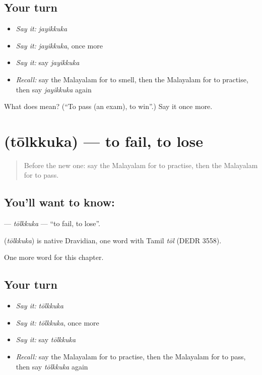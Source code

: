 \subsection*{Your turn}
\begin{itemize}
\raggedright
  \item \emph{Say it:} \emph{jayikkuka}
  \item \emph{Say it:} \emph{jayikkuka}, once more
  \item \emph{Say it:} say \emph{jayikkuka}
  \item \emph{Recall:} say the Malayalam for to smell, then the Malayalam for to practise, then say \emph{jayikkuka} again
\end{itemize}

\begin{tcolorbox}[breakable,colback=teal!4,colframe=teal!35!black,title={Before you move on}]
What does  mean? (\textquotedblleft{}To pass (an exam), to win\textquotedblright{}.) Say it once more.
\end{tcolorbox}
\section[\texorpdfstring{\ml{തോൽക്കുക} (tōlkkuka)}{തോൽക്കുക (tōlkkuka)}]{ (tōlkkuka) — to fail, to lose}

\label{lesson:ML-C267-tolkkuka}



\begin{quote}
Before the new one: say the Malayalam for to practise, then the Malayalam for to pass.
\end{quote}

\subsection*{You'll want to know: }
\textbf{} — \emph{tōlkkuka} — \textquotedblleft{}to fail, to lose\textquotedblright{}.

\begin{cousinweb}
\textbf{} (\emph{tōlkkuka}) is native Dravidian, one word with Tamil \emph{tōl} (DEDR 3558).
\end{cousinweb}

\begin{grammarlens}[title={What you've built}]
One more word for this chapter.
\end{grammarlens}

\subsection*{Your turn}
\begin{itemize}
\raggedright
  \item \emph{Say it:} \emph{tōlkkuka}
  \item \emph{Say it:} \emph{tōlkkuka}, once more
  \item \emph{Say it:} say \emph{tōlkkuka}
  \item \emph{Recall:} say the Malayalam for to practise, then the Malayalam for to pass, then say \emph{tōlkkuka} again
\end{itemize}

